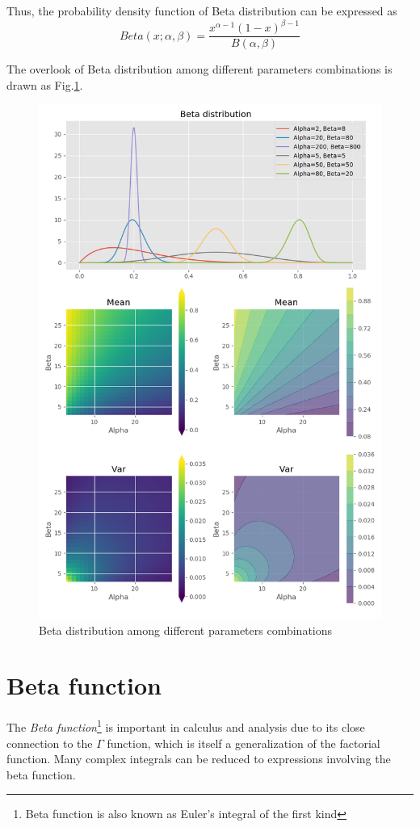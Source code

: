 \documentclass[a4paper]{article}
\begin{document}
Thus, the probability density function of Beta distribution can be expressed as 
\begin{equation}
    Beta(x; \alpha, \beta) = \frac{x^{\alpha-1} (1-x)^{\beta-1}}{B(\alpha, \beta)}
\end{equation}

The overlook of Beta distribution among different parameters combinations is drawn as Fig.\ref{fig: Beta distribution}.
\begin{figure}[H]
    \centering
    \includegraphics[height=0.5\textheight]{beta_distribution.png}
    \caption{Beta distribution among different parameters combinations}
    \label{fig: Beta distribution}
\end{figure}

\section{Beta function}
The \emph{Beta function}\footnote{Beta function is also known as Euler's integral of the first kind} is important in calculus and analysis due to its close connection to the $\Gamma$ function, which is itself a generalization of the factorial function.
Many complex integrals can be reduced to expressions involving the beta function.
\end{document}
